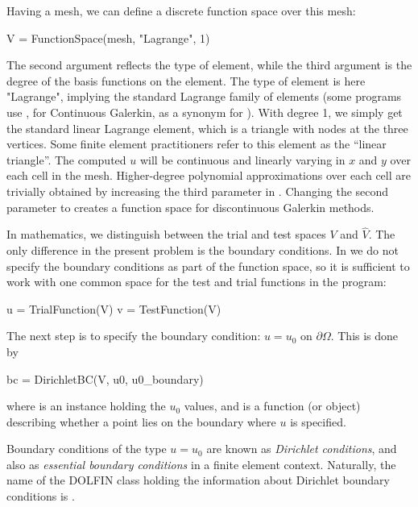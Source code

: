 Having a mesh, we can define a discrete function space  over this
mesh: 
\begin{python}
V = FunctionSpace(mesh, "Lagrange", 1)
\end{python}
The second argument reflects the type of element, while the third
argument is the degree of the basis functions on the element.
The type of element is here "Lagrange", implying the standard Lagrange
family of elements (some \fenics{} programs use , for
Continuous Galerkin, as a synonym for ).  With degree 1,
we simply get the standard linear Lagrange element, which is a triangle
with nodes at the three vertices.  Some finite element practitioners
refer to this element as the ``linear triangle''.  The computed $u$
will be continuous and linearly varying in $x$ and $y$ over each
cell in the mesh.  Higher-degree polynomial approximations over
each cell are trivially obtained by increasing the third parameter
in . Changing the second parameter to 
creates a function space for discontinuous Galerkin methods.

In mathematics, we distinguish between the trial and test spaces $V$
and $\hat{V}$. The only difference in the present problem is the
boundary conditions. In \fenics{} we do not specify the boundary
conditions as part of the function space, so it is sufficient to work
with one common space  for the test and trial functions in the
program:
\begin{python}
u = TrialFunction(V)
v = TestFunction(V)
\end{python}

The next step is to specify the boundary condition:
$u=u_0$ on $\partial\Omega$. This is done
by
\begin{python}
bc = DirichletBC(V, u0, u0_boundary)
\end{python}
where  is an instance holding the $u_0$ values, and
 is a function (or object) describing whether a point
lies on the boundary where $u$ is specified.

Boundary conditions of the type $u=u_0$ are known as \emph{Dirichlet
conditions}, and also as \emph{essential boundary conditions} in a finite
element context.  Naturally, the name of the DOLFIN class holding the
information about Dirichlet boundary conditions is .

